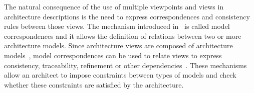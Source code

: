 


The natural consequence of the use of multiple viewpoints and views in architecture
descriptions is the need to express correspondences and consistency rules between those views.
The mechanism introduced in~\cite{42010} is called model correspondences and it allows the definition of relations between
two or more architecture models. Since architecture views are composed of architecture models~\cite{42010}, model correspondences can be used to
relate views to express consistency, traceability, refinement or other dependencies~\cite{Emery-Hilliard:2009}.
These mechanisms allow an architect to impose constraints between types of models and check whether these constraints are satisfied by the architecture. 






%
%
%





